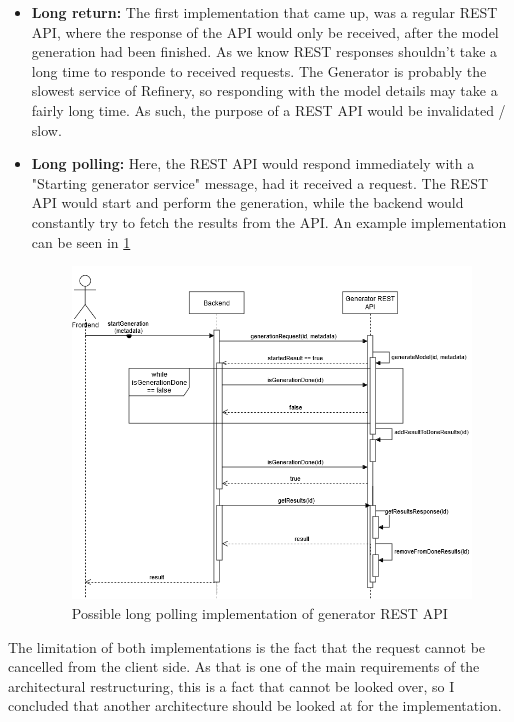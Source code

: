 \begin{itemize}
        \item \textbf{Long return:}
		The first implementation that came up, was a regular REST API, where the response of the API would only be received, after
		the model generation had been finished. As we know REST responses shouldn't take a long time to responde to received requests.
		The Generator is probably the slowest service of Refinery, so responding with the model details may take a fairly long time.
		As such, the purpose of a REST API would be invalidated / slow.
		\item \textbf{Long polling:}
		Here, the REST API would respond immediately with a "Starting generator service" message, had it received a request.
		The REST API would start and perform the generation, while the backend would constantly try to fetch the results from the API.
		An example implementation can be seen in \ref{longpollingimage}
		\begin{figure}[h!]
			\begin{center}
				\includegraphics[scale=0.5]{include/imgs/rest_long_poll.png}
				\caption{Possible long polling implementation of generator REST API}
				\label{longpollingimage}
			\end{center}
		\end{figure}
\end{itemize}
The limitation of both implementations is the fact that the request cannot be cancelled from the client side. As that is one 
of the main requirements of the architectural restructuring, this is a fact that cannot be looked over, so I concluded that 
another architecture should be looked at for the implementation.


